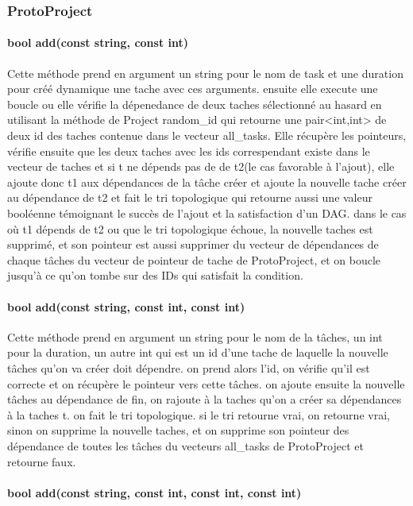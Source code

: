 \documentclass[paper=a4, fontsize=11pt, frenchb, englishb]{article}
\begin{document}
			\subsubsection{ProtoProject}
			
				\paragraph{bool add(const string, const int)}
				
Cette méthode prend en argument un string pour le nom de task et une duration pour créé dynamique une tache avec ces arguments. ensuite elle execute une boucle ou elle 
vérifie la dépenedance de deux taches sélectionné au hasard en utilisant la méthode de Project random\_id qui retourne une pair<int,int> de deux id des taches contenue dans 
le vecteur all\_tasks. Elle récupère les pointeurs, vérifie ensuite que les deux taches avec les ids correspendant existe dans le vecteur de taches et si t ne dépends pas de 
de t2(le cas favorable à l'ajout), elle ajoute donc t1 aux dépendances de la tâche créer et ajoute la nouvelle tache créer au dépendance de t2 et fait le tri topologique 
qui retourne aussi une valeur booléenne témoignant le succès de l'ajout et la satisfaction d'un DAG. dans le cas où t1 dépends de t2 ou que le tri topologique échoue, la 
nouvelle taches est supprimé, et son pointeur est aussi supprimer du vecteur de dépendances de chaque tâches du vecteur de pointeur de tache de ProtoProject, et on boucle 
jusqu'à ce qu'on tombe sur des IDs qui satisfait la condition.

				
				\paragraph{bool add(const string, const int, const int)}
				
Cette méthode prend en argument un string pour le nom de la tâches, un int pour la duration, un autre int qui est un id d'une tache de laquelle la nouvelle tâches qu'on va 
créer doit dépendre. on prend alors l'id, on vérifie qu'il est correcte et on récupère le pointeur vers cette tâches. on ajoute ensuite la nouvelle tâches au dépendance de 
fin, on rajoute à la taches qu'on a créer sa dépendances à la taches t. on fait le tri topologique. si le tri retourne vrai, on retourne vrai, sinon on supprime la nouvelle 
taches, et on supprime son pointeur des dépendance de toutes les tâches du vecteurs all\_tasks de ProtoProject et retourne faux.

				
				\paragraph{bool add(const string, const int, const int, const int)}
				
\end{document}
